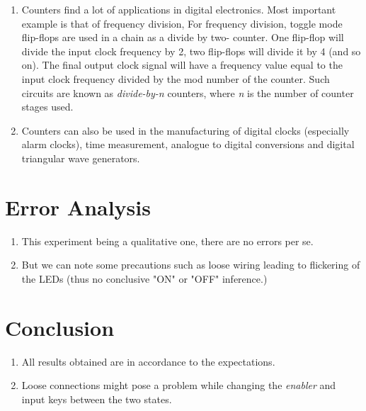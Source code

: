 \begin{enumerate}
    \item Counters find a lot of applications in digital electronics. Most important example is that of frequency division, For frequency division, toggle mode flip-flops are used in a chain as a divide by two- counter. One flip-flop will divide the input clock frequency by 2, two flip-flops will divide it by 4 (and so on). The final  output clock signal will have a frequency value equal to the input clock frequency divided by the mod number of the counter. Such circuits are known as \emph{divide-by-n} counters, where \emph{n} is the number of counter stages used.
    \item Counters can also be used in the manufacturing of digital clocks (especially alarm clocks), time measurement, analogue to digital conversions and digital triangular wave generators.
\end{enumerate}
\section{Error Analysis}
\begin{enumerate}
    \item This experiment being a qualitative one, there are no errors per se.
    \item But we can note some precautions such as loose wiring leading to flickering of the LEDs (thus no conclusive "ON" or "OFF" inference.)
\end{enumerate}
\section{Conclusion}
\begin{enumerate}
    \item All results obtained are in accordance to the expectations.
    \item Loose connections might pose a problem while changing the \emph{enabler} and input keys between the two states.
\end{enumerate}